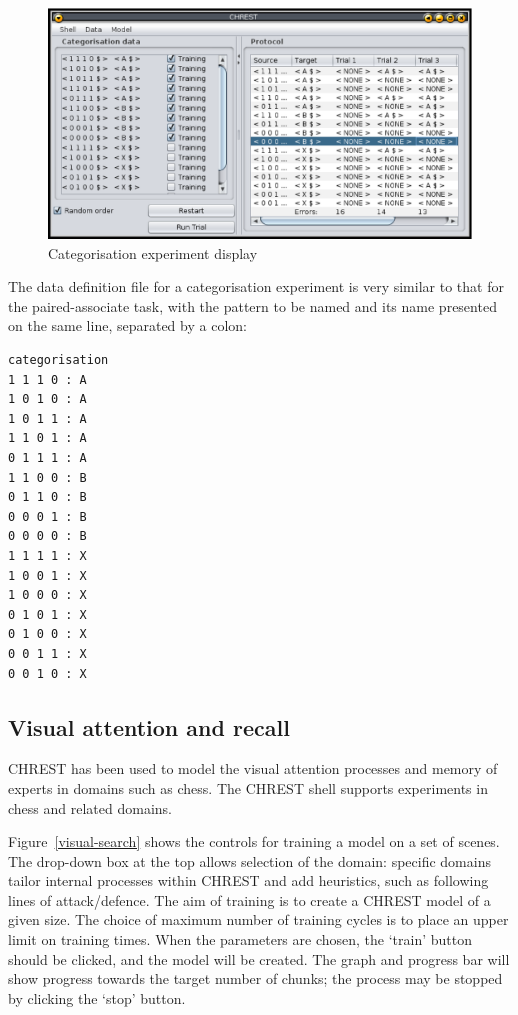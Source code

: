 \documentclass{article}
\begin{document}
\begin{figure}
\includegraphics[width=\textwidth]{images/categorisation.eps}
\caption{Categorisation experiment display}
\label{categorisation}
\end{figure}

The data definition file for a categorisation experiment is very similar to
that for the paired-associate task, with the pattern to be named and its name
presented on the same line, separated by a colon:

\begin{verbatim}
categorisation 
1 1 1 0 : A 
1 0 1 0 : A 
1 0 1 1 : A 
1 1 0 1 : A 
0 1 1 1 : A 
1 1 0 0 : B 
0 1 1 0 : B 
0 0 0 1 : B 
0 0 0 0 : B 
1 1 1 1 : X 
1 0 0 1 : X 
1 0 0 0 : X 
0 1 0 1 : X 
0 1 0 0 : X 
0 0 1 1 : X 
0 0 1 0 : X 
\end{verbatim}

\subsection{Visual attention and recall}

CHREST has been used to model the visual attention processes and memory of
experts in domains such as chess.  The CHREST shell supports experiments in
chess and related domains. 

Figure~\ref{visual-search} shows the controls for training a model on a set of
scenes.  The drop-down box at the top allows selection of the domain: specific
domains tailor internal processes within CHREST and add heuristics, such as
following lines of attack/defence.  The aim of training is to create a CHREST
model of a given size.  The choice of maximum number of training cycles is to
place an upper limit on training times.  When the parameters are chosen, the
`train' button should be clicked, and the model will be created.  The graph and
progress bar will show progress towards the target number of chunks; the
process may be stopped by clicking the `stop' button.
\end{document}

